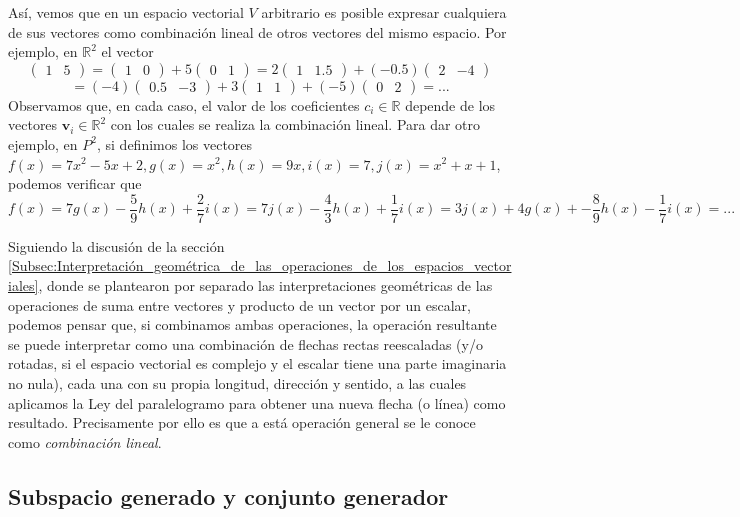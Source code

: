 \documentclass[12pt,dvipsnames]{article}
\begin{document}
Así, vemos que en un espacio vectorial $V$ arbitrario es posible expresar cualquiera de sus vectores como combinación lineal de otros vectores del mismo espacio. Por ejemplo, en $\mathbb{R}^2$ el vector $$\begin{pmatrix} 1 & 5 \end{pmatrix} = \begin{pmatrix} 1 & 0 \end{pmatrix} + 5\begin{pmatrix} 0 & 1 \end{pmatrix} = 2\begin{pmatrix} 1 & 1.5 \end{pmatrix} + (-0.5)\begin{pmatrix} 2 & -4 \end{pmatrix} $$ $$ = (-4)\begin{pmatrix} 0.5 & -3 \end{pmatrix} + 3\begin{pmatrix} 1 & 1 \end{pmatrix} + (-5)\begin{pmatrix} 0 & 2 \end{pmatrix} = ...$$ \noindent Observamos que, en cada caso, el valor de los coeficientes $c_i\in\mathbb{R}$ depende de los vectores $\mathbf{v}_i\in\mathbb{R}^2$ con los cuales se realiza la combinación lineal. Para dar otro ejemplo, en $P^2$, si definimos los vectores $f(x) = 7x^2 - 5x + 2, g(x) = x^2, h(x) = 9x, i(x)=7, j(x)=x^2 + x + 1$, podemos verificar que $$f(x) = 7g(x)-\frac{5}{9}h(x)+\frac{2}{7}i(x)=7j(x)-\frac{4}{3}h(x)+\frac{1}{7}i(x)=3j(x)+4g(x)+-\frac{8}{9}h(x)-\frac{1}{7}i(x)=...$$

Siguiendo la discusión de la sección \ref{Subsec:Interpretación_geométrica_de_las_operaciones_de_los_espacios_vectoriales}, donde se plantearon por separado las interpretaciones geométricas de las operaciones de suma entre vectores y producto de un vector por un escalar, podemos pensar que, si combinamos ambas operaciones, la operación resultante se puede interpretar como una combinación de flechas rectas reescaladas (y/o rotadas, si el espacio vectorial es complejo y el escalar tiene una parte imaginaria no nula), cada una con su propia longitud, dirección y sentido, a las cuales aplicamos la Ley del paralelogramo para obtener una nueva flecha (o línea) como resultado. Precisamente por ello es que a está operación general se le conoce como \emph{combinación lineal}.

\newpage
\subsection{Subspacio generado y conjunto generador} \label{Subsec:Espacio_generado_y_conjunto_generador}
\end{document}
